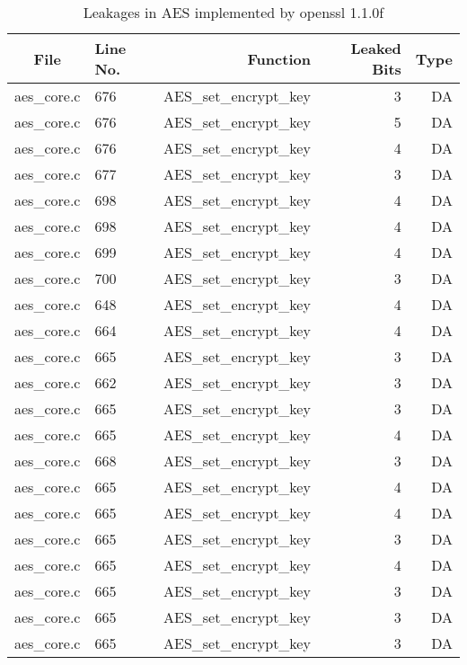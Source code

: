 \begin{table}%
\centering\tiny\scriptsize
\renewcommand{\baselinestretch}{0.96}\selectfont
\caption{Leakages in AES implemented by openssl 1.1.0f}\label{tab:AESopenssl}
\begin{tabular}{clrrr}
\hline
\textbf{File} & \textbf{Line No.} & \textbf{Function} & \textbf{Leaked Bits} & \textbf{Type} \\\hline
aes\_core.c& 676&AES\_set\_encrypt\_key&3 &DA\\
aes\_core.c& 676&AES\_set\_encrypt\_key&5 &DA\\
aes\_core.c& 676&AES\_set\_encrypt\_key&4 &DA\\
aes\_core.c& 677&AES\_set\_encrypt\_key&3 &DA\\
aes\_core.c& 698&AES\_set\_encrypt\_key&4 &DA\\
aes\_core.c& 698&AES\_set\_encrypt\_key&4 &DA\\
aes\_core.c& 699&AES\_set\_encrypt\_key&4 &DA\\
aes\_core.c& 700&AES\_set\_encrypt\_key&3 &DA\\
aes\_core.c& 648&AES\_set\_encrypt\_key&4 &DA\\
aes\_core.c& 664&AES\_set\_encrypt\_key&4 &DA\\
aes\_core.c& 665&AES\_set\_encrypt\_key&3 &DA\\
aes\_core.c& 662&AES\_set\_encrypt\_key&3 &DA\\
aes\_core.c& 665&AES\_set\_encrypt\_key&3 &DA\\
aes\_core.c& 665&AES\_set\_encrypt\_key&4 &DA\\
aes\_core.c& 668&AES\_set\_encrypt\_key&3 &DA\\
aes\_core.c& 665&AES\_set\_encrypt\_key&4 &DA\\
aes\_core.c& 665&AES\_set\_encrypt\_key&4 &DA\\
aes\_core.c& 665&AES\_set\_encrypt\_key&3 &DA\\
aes\_core.c& 665&AES\_set\_encrypt\_key&4 &DA\\
aes\_core.c& 665&AES\_set\_encrypt\_key&3 &DA\\
aes\_core.c& 665&AES\_set\_encrypt\_key&3 &DA\\
aes\_core.c& 665&AES\_set\_encrypt\_key&3 &DA\\

\end{tabular}
\end{table}
